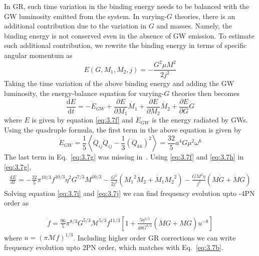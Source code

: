 \documentclass[11pt]{article}
\begin{document}
In GR, such time variation in the binding energy needs to be balanced with the GW luminosity emitted from the system. In varying-$G$ theories, there is an additional contribution due to the variation in $G$ and masses. Namely, the binding energy is not conserved even in the absence of GW emission. To estimate such additional contribution, we rewrite the binding energy in terms of specific angular momentum as
 \begin{equation}\label{eq:3.7f}
 E(G,M_1,M_2,j)=-\frac{G^2 \mu  M^2}{2 j^2}
 \end{equation}
 \hspace*{15.5pt} Taking the time variation of the above binding energy and adding the GW luminosity, the energy-balance equation for varying-$G$ theories then becomes
 \begin{equation}\label{eq:3.7g}
\frac{\mathrm{d} E}{\mathrm{d} t}=-\dot{E}_{GW}+\frac{\partial E}{\partial M_1}\dot{M_1}+\frac{\partial E}{\partial M_2}\dot{M_2}+\frac{\partial E}{\partial G}\dot{G}
 \end{equation}
 where $E$ is given by equation \eqref{eq:3.7f} and $\dot{E}_{GW}$ is the energy radiated by GWs. Using the quadruple formula, the first term in the above equation is given by
 \begin{equation}\label{eq:3.7h}
 \dot{E}_{GW}=\frac{1}{5}\left \langle\dddot{Q}_{ij}\dddot{Q}_{ij}-\frac{1}{3}(\dddot{Q}_{kk})^2\right \rangle=\frac{32}{5} a^4 G \mu ^2 \omega ^6
 \end{equation}
 The last term in Eq.~\eqref{eq:3.7g} was missing in~\cite{Yunes:2009bv}.
 Using \eqref{eq:3.7f} and \eqref{eq:3.7h} in \eqref{eq:3.7g},
 \begin{align}\label{eq:3.7i}
\frac{\mathrm{d} E}{\mathrm{d} t}=- \frac{32}{5} \pi ^{10/3} f^{10/3} \eta ^2 G^{7/3} M^{10/3}-\frac{G^2}{2j^2}({M_1}^2\dot{M}_2+\dot{M}_1{M_2}^2)-\frac{GM^2\eta}{j^2}(M\dot{G}+\dot{M}G)
 \end{align}
 \hspace{15.5pt}Solving equation \eqref{eq:3.7i} and \eqref{eq:3.7j} we can find frequency evolution upto -4PN order as
 
 \begin{align} 
 \dot{f}=\frac{96}{5}\pi^{8/3}G^{5/3}\mathcal{M}^{5/3}f^{11/3}[1+\frac{5\eta^{3/5}}{48 G^{8/3}}(\dot{M}G+M\dot{G})u^{-8}]
 \end{align} 
 where $u=(\pi \mathcal{M}f)^{1/3}$. Including higher order GR corrections we can write frequency evolution upto 2PN order, which matches with Eq.~\eqref{eq:3.7b}.
 
\end{document}
